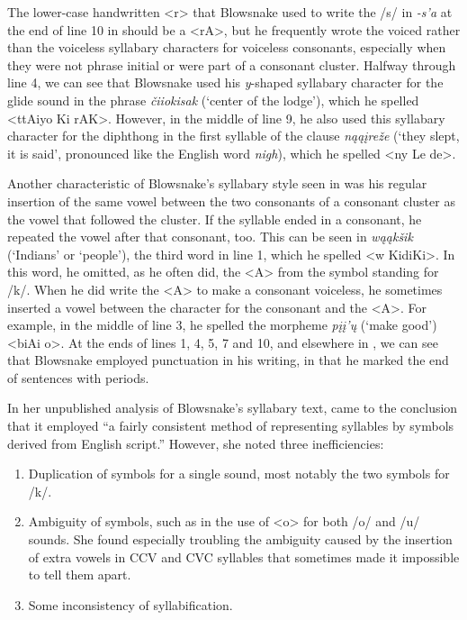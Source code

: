 \documentclass[output=paper]{LSP/langsci}
\begin{document}
The lower-case handwritten <r> that Blowsnake used to write the /s/ in \emph{-s'a} at the end of line 10 in  should be a <rA>, but he frequently wrote the voiced rather than the voiceless syllabary characters for voiceless consonants, especially when they were not phrase initial or were part of a consonant cluster. Halfway through line 4, we can see that Blowsnake used his \emph{y}-shaped syllabary character for the glide sound in the phrase \emph{\v{c}iiokisak} (`center of the lodge'), which he spelled <ttAiyo Ki rAK>. However, in the middle of line 9, he also used this syllabary character for the diphthong in the first syllable of the clause \emph{n\k{a}\k{a}\k{i}re\v{z}e} (`they slept, it is said', pronounced like the English word \emph{nigh}), which he spelled <ny Le de>.  

Another characteristic of Blowsnake's syllabary style seen in  was his regular insertion of the same vowel between the two consonants of a consonant cluster as the vowel that followed the cluster. If the syllable ended in a consonant, he repeated the vowel after that consonant, too. This can be seen in \emph{w\k{a}\k{a}k\v{s}ik} (`Indians' or `people'), the third word in line 1, which he spelled <w KidiKi>. In this word, he omitted, as he often did, the <A> from the symbol standing for /k/. When he did write the <A> to make a consonant voiceless, he sometimes inserted a vowel between the character for the consonant and the <A>. For example, in the middle of line 3, he spelled the morpheme \emph{p\k{i}\k{i}'\k{u}} (`make good') <biAi o>. At the ends of lines 1, 4, 5, 7 and 10, and elsewhere in , we can see that Blowsnake employed punctuation in his writing, in that he marked the end of sentences with periods.

In her unpublished analysis of Blowsnake's syllabary text, \citeauthor{Susman1939} came to the conclusion that it employed ``a fairly consistent method of representing syllables by symbols derived from English script.'' However, she noted three inefficiencies: 


\begin{enumerate}
\item{Duplication of symbols for a single sound, most notably the two symbols for /k/.}
\item{Ambiguity of symbols, such as in the use of <o> for both /o/ and /u/ sounds. She found especially troubling the ambiguity caused by the insertion of extra vowels in CCV and CVC syllables that sometimes made it impossible to tell them apart.}
\item{Some inconsistency of syllabification.}
\end{enumerate}
\end{document}
